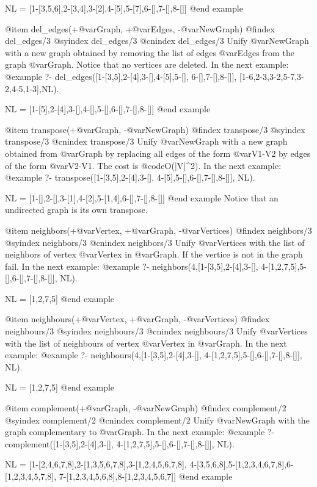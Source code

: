 {{{{{{{{{NL = [1-[3,5,6],2-[3,4],3-[2],4-[5],5-[7],6-[],7-[],8-[]]
@end example

@item del_edges(+@var{Graph}, +@var{Edges}, -@var{NewGraph})
@findex  del_edges/3
@syindex del_edges/3
@cnindex del_edges/3
Unify @var{NewGraph} with a new graph obtained by removing the list of
edges @var{Edges} from the graph @var{Graph}. Notice that no vertices
are deleted. In the next example:
@example
?- del_edges([1-[3,5],2-[4],3-[],4-[5],5-[],
              6-[],7-[],8-[]],
             [1-6,2-3,3-2,5-7,3-2,4-5,1-3],NL).

NL = [1-[5],2-[4],3-[],4-[],5-[],6-[],7-[],8-[]]
@end example

@item transpose(+@var{Graph}, -@var{NewGraph})
@findex  transpose/3
@syindex transpose/3
@cnindex transpose/3
Unify @var{NewGraph} with a new graph obtained from @var{Graph} by
replacing all edges of the form @var{V1-V2} by edges of the form
@var{V2-V1}. The cost is @code{O(|V|^2)}. In the next example:
@example
?- transpose([1-[3,5],2-[4],3-[],
              4-[5],5-[],6-[],7-[],8-[]], NL).

NL = [1-[],2-[],3-[1],4-[2],5-[1,4],6-[],7-[],8-[]]
@end example
Notice that an undirected graph is its own transpose.

@item neighbors(+@var{Vertex}, +@var{Graph}, -@var{Vertices})
@findex  neighbors/3
@syindex neighbors/3
@cnindex neighbors/3
Unify @var{Vertices} with the list of neighbors of vertex @var{Vertex}
in @var{Graph}. If the vertice is not in the graph fail. In the next
example:
@example
?- neighbors(4,[1-[3,5],2-[4],3-[],
                4-[1,2,7,5],5-[],6-[],7-[],8-[]],
             NL).

NL = [1,2,7,5]
@end example

@item neighbours(+@var{Vertex}, +@var{Graph}, -@var{Vertices})
@findex  neighbours/3
@syindex neighbours/3
@cnindex neighbours/3
Unify @var{Vertices} with the list of neighbours of vertex @var{Vertex}
in @var{Graph}. In the next example:
@example
?- neighbours(4,[1-[3,5],2-[4],3-[],
                 4-[1,2,7,5],5-[],6-[],7-[],8-[]], NL).

NL = [1,2,7,5]
@end example

@item complement(+@var{Graph}, -@var{NewGraph})
@findex  complement/2
@syindex complement/2
@cnindex complement/2
Unify @var{NewGraph} with the graph complementary to @var{Graph}.
 In the next example:
@example
?- complement([1-[3,5],2-[4],3-[],
               4-[1,2,7,5],5-[],6-[],7-[],8-[]], NL).

NL = [1-[2,4,6,7,8],2-[1,3,5,6,7,8],3-[1,2,4,5,6,7,8],
      4-[3,5,6,8],5-[1,2,3,4,6,7,8],6-[1,2,3,4,5,7,8],
      7-[1,2,3,4,5,6,8],8-[1,2,3,4,5,6,7]]
@end example

}}}}}}}}}
